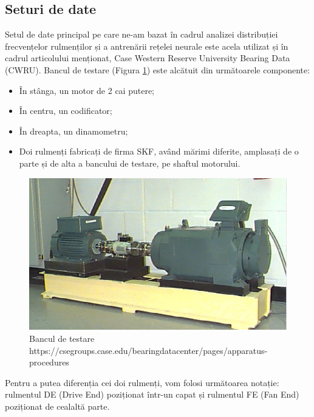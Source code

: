 \documentclass[a4paper,12pt]{report}
\begin{document}
    	\subsection{Seturi de date}
    	Setul de date principal pe care ne-am bazat în cadrul analizei distribuției frecvențelor rulmenților și a antrenării rețelei neurale este acela utilizat și în cadrul articolului menționat, Case Western Reserve University Bearing Data (CWRU). Bancul de testare (Figura \ref{fig:test_bench}) este alcătuit din următoarele componente:
    	
    	\begin{itemize}
    		\item În stânga, un motor de 2 cai putere;
    		\item În centru, un codificator;
    		\item În dreapta, un dinamometru;
    		\item Doi rulmenți fabricați de firma SKF, având mărimi diferite, amplasați de o parte și de alta a bancului de testare, pe shaftul motorului.
    	\end{itemize}
    	
    	\begin{figure}[H]
    		\begin{center}
    			\includegraphics[scale=0.5]{images/CWRU.jpg}
    		\end{center}
    		\caption{Bancul de testare \newline
    			\hspace{\linewidth}https://csegroups.case.edu/bearingdatacenter/pages/apparatus-procedures}
    		\label{fig:test_bench}
    	\end{figure}
    
    	Pentru a putea diferenția cei doi rulmenți, vom folosi următoarea notație: rulmentul DE (Drive End) poziționat într-un capat și rulmentul FE (Fan End) poziționat de cealaltă parte. 
    	
\end{document}
